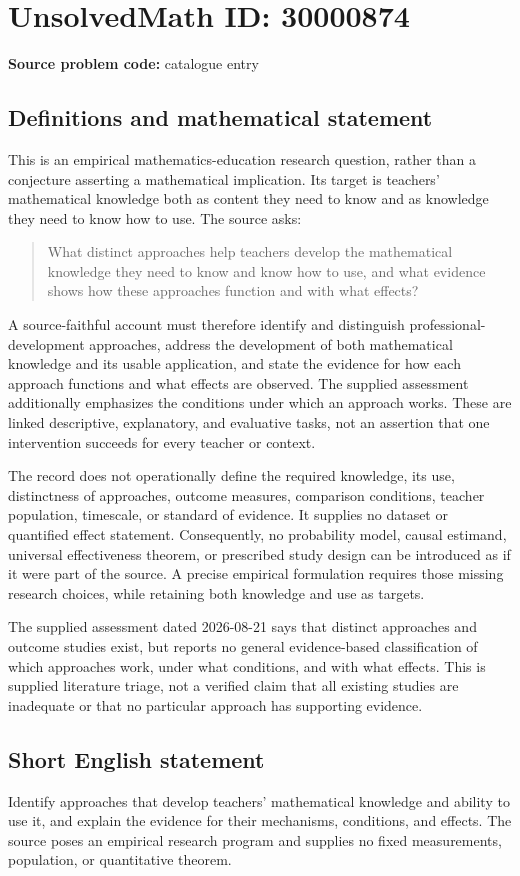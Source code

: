 \documentclass[11pt]{article}
\begin{document}
\section*{UnsolvedMath ID: 30000874}
\textbf{Source problem code:} catalogue entry
\subsection{Definitions and mathematical statement}
This is an empirical mathematics-education research question, rather than a conjecture asserting a mathematical implication. Its target is teachers' mathematical knowledge both as content they need to know and as knowledge they need to know how to use. The source asks:
\begin{quote}
What distinct approaches help teachers develop the mathematical knowledge they need to know and know how to use, and what evidence shows how these approaches function and with what effects?
\end{quote}
A source-faithful account must therefore identify and distinguish professional-development approaches, address the development of both mathematical knowledge and its usable application, and state the evidence for how each approach functions and what effects are observed. The supplied assessment additionally emphasizes the conditions under which an approach works. These are linked descriptive, explanatory, and evaluative tasks, not an assertion that one intervention succeeds for every teacher or context.

The record does not operationally define the required knowledge, its use, distinctness of approaches, outcome measures, comparison conditions, teacher population, timescale, or standard of evidence. It supplies no dataset or quantified effect statement. Consequently, no probability model, causal estimand, universal effectiveness theorem, or prescribed study design can be introduced as if it were part of the source. A precise empirical formulation requires those missing research choices, while retaining both knowledge and use as targets.

The supplied assessment dated 2026-08-21 says that distinct approaches and outcome studies exist, but reports no general evidence-based classification of which approaches work, under what conditions, and with what effects. This is supplied literature triage, not a verified claim that all existing studies are inadequate or that no particular approach has supporting evidence.
\subsection{Short English statement}
Identify approaches that develop teachers' mathematical knowledge and ability to use it, and explain the evidence for their mechanisms, conditions, and effects. The source poses an empirical research program and supplies no fixed measurements, population, or quantitative theorem.
\end{document}
